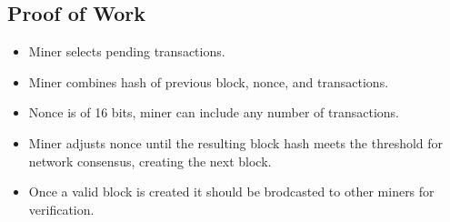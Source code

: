 \documentclass{article}
\begin{document}
\subsection{Proof of Work}
\begin{itemize}
\item Miner selects pending transactions.
\item Miner combines hash of previous block, nonce, and transactions.
\item Nonce is of 16 bits, miner can include any number of transactions.
\item Miner adjusts nonce until the resulting block hash meets the threshold for network consensus, creating the next block.
\item Once a valid block is created it should be brodcasted to other miners for verification.
\end{itemize}
\end{document}
